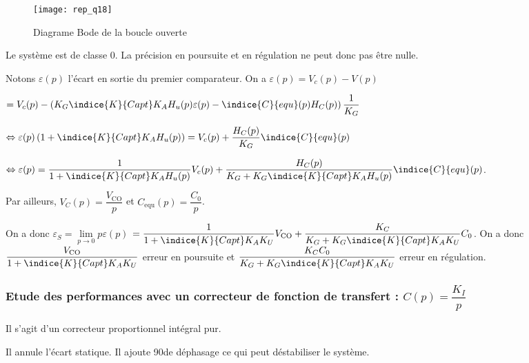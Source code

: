 \begin{figure}[t]
\centering
\texttt{[image: rep\_q18]}
\caption{Diagrame Bode de la boucle ouverte \label{rep_q_18}}
\end{figure}

\fi


\ifprof
\begin{corrige}
Le système est de classe 0. La précision en poursuite et en régulation ne peut donc pas être nulle.

Notons $\varepsilon(p)$ l'écart en sortie du premier comparateur. On a  
$\varepsilon(p) = V_c(p)-V(p)$

$=V_c(p)-\left(K_G\indice{K}{Capt}K_A H_u(p) \varepsilon(p)- \indice{C}{equ}(p)H_C(p) \right)\dfrac{1}{K_G}$ 

$\Leftrightarrow \varepsilon(p)\left( 1+ \indice{K}{Capt}K_A H_u(p)\right)=V_c(p)+  \dfrac{H_C(p)}{K_G}\indice{C}{equ}(p)$

$\Leftrightarrow \varepsilon(p)=\dfrac{1}{1+ \indice{K}{Capt}K_A H_u(p)}V_c(p)+ \dfrac{H_C(p)}{K_G+ K_G\indice{K}{Capt}K_A H_u(p)}\indice{C}{equ}(p)$.

Par ailleurs, $V_C (p)=\dfrac{V_{\text{CO}}}{p}$ et $C_{\text{equ}} (p) = \dfrac{C_0}{p}$.

On a donc $\varepsilon_S = \lim\limits_{p\to 0} p \varepsilon(p)$
$=\dfrac{1}{1+ \indice{K}{Capt}K_A K_U}V_{\text{CO}}+ \dfrac{K_C}{K_G+ K_G\indice{K}{Capt}K_A K_U}C_0$.
On a donc $\dfrac{V_{\text{CO}}}{1+ \indice{K}{Capt}K_A K_U}$ erreur en poursuite et 
$\dfrac{K_C C_0}{K_G+ K_G\indice{K}{Capt}K_A K_U}$ erreur en régulation.
\end{corrige}
\else
\fi


\subsubsection{Etude des performances avec un correcteur de fonction de transfert : $C(p)=\dfrac{K_I}{p}$}

\ifprof
\begin{corrige}
Il s'agit d'un correcteur proportionnel intégral pur. 

Il annule l'écart statique. Il ajoute 90\degres de déphasage ce qui peut déstabiliser le système.
\end{corrige}
\else
\fi


